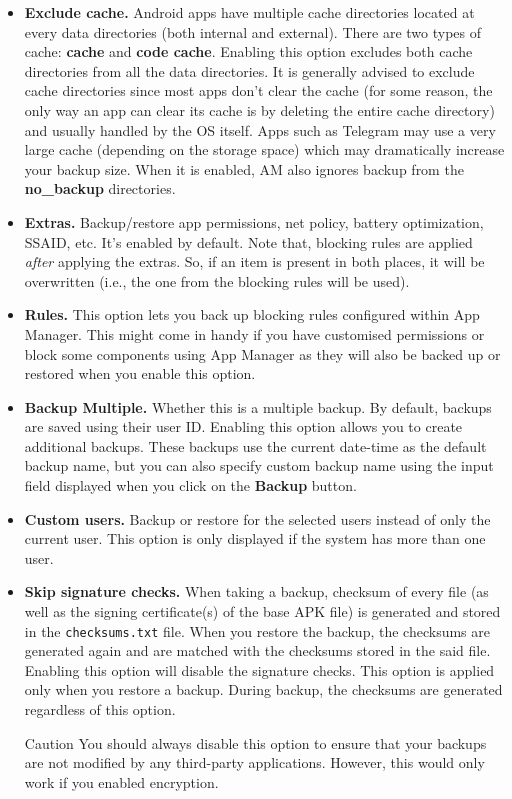 \begin{itemize}
    \item \textbf{Exclude cache.} Android apps have multiple cache directories located at every data directories (both
    internal and external). There are two types of cache: \textbf{cache} and \textbf{code cache}. Enabling this option
    excludes both cache directories from all the data directories. It is generally advised to exclude cache directories
    since most apps don't clear the cache (for some reason, the only way an app can clear its cache is by deleting the
    entire cache directory) and usually handled by the OS itself. Apps such as Telegram may use a very large cache
    (depending on the storage space) which may dramatically increase your backup size. When it is enabled, AM also
    ignores backup from the \textbf{no\_backup} directories.

    \item \textbf{Extras.} Backup/restore app permissions, net policy, battery optimization, SSAID, etc. It's enabled
    by default. Note that, blocking rules are applied \textit{after} applying the extras. So, if an item is present in
    both places, it will be overwritten (i.e., the one from the blocking rules will be used).

    \item \textbf{Rules.} This option lets you back up blocking rules configured within App Manager. This might come in
    handy if you have customised permissions or block some components using App Manager as they will also be backed up
    or restored when you enable this option.

    \item \textbf{Backup Multiple.} Whether this is a multiple backup. By default, backups are saved using their user
    ID. Enabling this option allows you to create additional backups. These backups use the current date-time as the
    default backup name, but you can also specify custom backup name using the input field displayed when you click on
    the \textbf{Backup} button.

    \item \textbf{Custom users.} Backup or restore for the selected users instead of only the current user. This option
    is only displayed if the system has more than one user.

    \item \textbf{Skip signature checks.} When taking a backup, checksum of every file (as well as the signing
    certificate(s) of the base APK file) is generated and stored in the \texttt{checksums.txt} file. When you restore
    the backup, the checksums are generated again and are matched with the checksums stored in the said file. Enabling
    this option will disable the signature checks. This option is applied only when you restore a backup. During backup,
    the checksums are generated regardless of this option.
    \begin{warning}{Caution}
        You should always disable this option to ensure that your backups are not modified by any third-party
        applications. However, this would only work if you enabled encryption.
    \end{warning}
\end{itemize}


